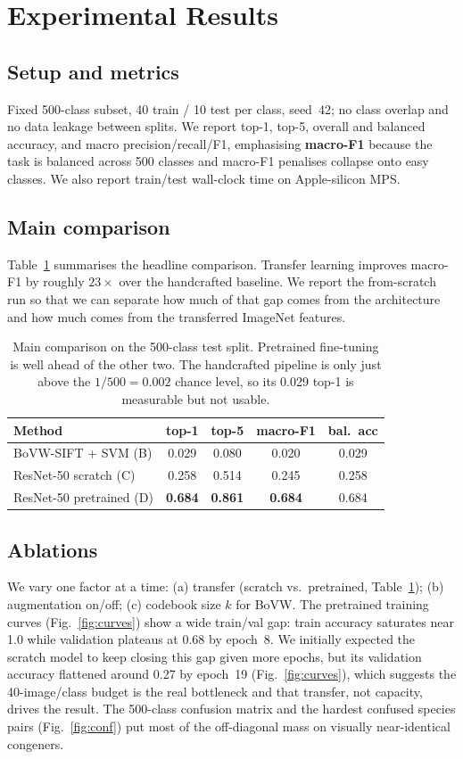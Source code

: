 \documentclass[10pt,twocolumn,letterpaper]{article}
\begin{document}
\section{Experimental Results}\label{sec:exp}
\subsection{Setup and metrics}
Fixed 500-class subset, 40 train / 10 test per class, seed~42; no class overlap and no
data leakage between splits. We report top-1, top-5, overall and balanced accuracy, and
macro precision/recall/F1, emphasising \textbf{macro-F1} because the task is balanced
across 500 classes and macro-F1 penalises collapse onto easy classes. We also report
train/test wall-clock time on Apple-silicon MPS.

\subsection{Main comparison}
Table~\ref{tab:main} summarises the headline comparison. Transfer learning improves
macro-F1 by roughly $23\times$ over the handcrafted baseline. We report the from-scratch
run so that we can separate how much of that gap comes from the architecture and how
much comes from the transferred ImageNet features.

\begin{table}[t]\centering\small
\begin{tabular}{lcccc}
\toprule
Method & top-1 & top-5 & macro-F1 & bal.\ acc \\
\midrule
BoVW-SIFT + SVM (B)          & 0.029 & 0.080 & 0.020 & 0.029 \\
ResNet-50 scratch (C)        & 0.258 & 0.514 & 0.245 & 0.258 \\
ResNet-50 pretrained (D)     & \textbf{0.684} & \textbf{0.861} & \textbf{0.684} & 0.684 \\
\bottomrule
\end{tabular}
\caption{Main comparison on the 500-class test split. Pretrained fine-tuning is well
ahead of the other two. The handcrafted pipeline is only just above the $1/500{=}0.002$
chance level, so its 0.029 top-1 is measurable but not usable.}
\label{tab:main}
\end{table}

\subsection{Ablations}
We vary one factor at a time: (a) transfer (scratch vs.\ pretrained, Table~\ref{tab:main});
(b) augmentation on/off; (c) codebook size $k$ for BoVW. The pretrained training curves
(Fig.~\ref{fig:curves}) show a wide train/val gap: train accuracy saturates near
1.0 while validation plateaus at 0.68 by epoch~8. We initially expected the scratch
model to keep closing this gap given more epochs, but its validation accuracy flattened
around 0.27 by epoch~19 (Fig.~\ref{fig:curves}), which suggests the 40-image/class budget
is the real bottleneck and that transfer, not capacity, drives the result. The 500-class
confusion matrix and the hardest confused species pairs (Fig.~\ref{fig:conf}) put most of
the off-diagonal mass on visually near-identical congeners.
\end{document}
